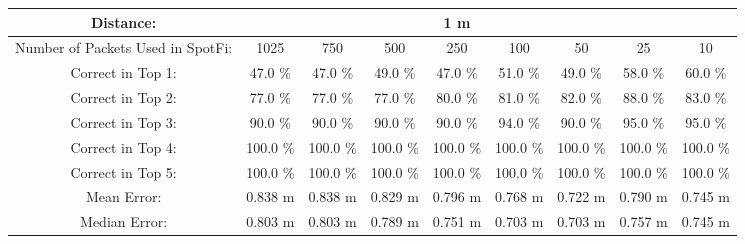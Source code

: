 \begin{tabular}{| c || c | c | c | c | c | c | c | c |}
\hline
Distance: &  &  &  & 1 m  &  &  &  &  \\
\hline
Number of Packets Used in SpotFi: & 1025 & 750 & 500 & 250 & 100 & 50 & 25 & 10 \\
\hline
\hline
Correct in Top 1: & 47.0 \% & 47.0 \% & 49.0 \% & 47.0 \% & 51.0 \% & 49.0 \% & 58.0 \% & 60.0 \% \\
\hline
Correct in Top 2: & 77.0 \% & 77.0 \% & 77.0 \% & 80.0 \% & 81.0 \% & 82.0 \% & 88.0 \% & 83.0 \% \\
\hline
Correct in Top 3: & 90.0 \% & 90.0 \% & 90.0 \% & 90.0 \% & 94.0 \% & 90.0 \% & 95.0 \% & 95.0 \% \\
\hline
Correct in Top 4: & 100.0 \% & 100.0 \% & 100.0 \% & 100.0 \% & 100.0 \% & 100.0 \% & 100.0 \% & 100.0 \% \\
\hline
Correct in Top 5: & 100.0 \% & 100.0 \% & 100.0 \% & 100.0 \% & 100.0 \% & 100.0 \% & 100.0 \% & 100.0 \% \\
\hline
\hline
Mean Error: & 0.838 m & 0.838 m & 0.829 m & 0.796 m & 0.768 m & 0.722 m & 0.790 m & 0.745 m \\
\hline
Median Error: & 0.803 m & 0.803 m & 0.789 m & 0.751 m & 0.703 m & 0.703 m & 0.757 m & 0.745 m \\
\hline
\end{tabular}